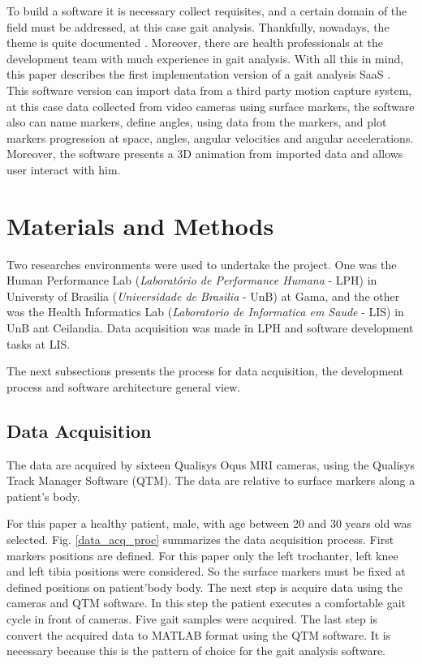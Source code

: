 \documentclass[journal]{IEEEtran}
\begin{document}
To build a software it is necessary collect requisites, and a certain domain
of the field must be addressed, at this case gait analysis. 
Thankfully, nowadays, the theme is quite documented
\cite{Perry2010, Whittle2012, Ferreira2009, Vieira2015, 
Duhamel2004, Ghoussayni2004, Moreno2009, Beynon2010}. 
Moreover, there are health professionals at the development team with much
experience in gait analysis. With all this in mind, this paper describes the
first implementation version of a gait analysis SaaS \cite{Lima2015}.
This software version can import data from a third party motion capture system, at this
case data collected from video cameras using surface markers, the software
also can name markers, define angles, using data from the markers, and plot 
markers progression at space, angles, angular velocities and angular accelerations.
Moreover, the software presents a 3D animation from imported data and allows user 
interact with him.



\section{Materials and Methods}

Two researches environments were used to undertake the project. 
One was the Human Performance Lab (\emph{Laboratório de Performance Humana} - LPH) in
Universty of Brasilia (\emph{Universidade de Brasilia} - UnB) at Gama, 
and the other was the Health Informatics Lab (\emph{Laboratorio de Informatica em Saude} - LIS)
in UnB ant Ceilandia. 
Data acquisition was made in LPH and software development tasks at LIS.

The next subsections presents the process for data acquisition,
the development process and software architecture general
view.

\subsection{Data Acquisition}

The data are acquired by sixteen Qualisys Oqus MRI cameras, using
the Qualisys Track Manager Software (QTM). 
The data are relative to surface markers along a patient's body.

For this paper a healthy patient, male, with age between 20 and 30 years old
was selected.
Fig. \ref{data_acq_proc} summarizes the data acquisition process.
First   markers positions are defined. 
For this paper only the left trochanter, left knee and left tibia
positions were considered. 
So the surface markers must be fixed at defined positions on patient'body body.
The next step is acquire data using the cameras and QTM software. In this
step the patient executes a comfortable gait cycle in front of cameras.
Five gait samples were acquired.
The last step is convert the acquired data to MATLAB format using the QTM
software. It is necessary because this is the pattern of choice for 
the gait analysis software.
\end{document}
